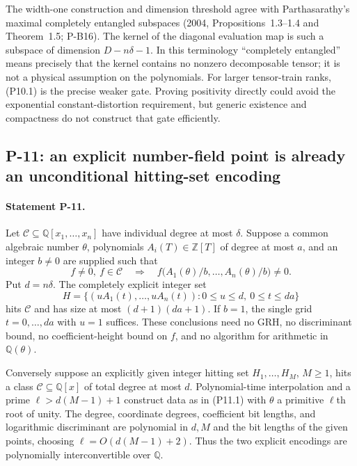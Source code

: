 \documentclass[11pt,a4paper]{article}
\theoremstyle{definition}\newtheorem{definition}{Definition}
\begin{document}
The width-one construction and dimension threshold agree with Parthasarathy's maximal completely entangled subspaces (2004, Propositions~1.3--1.4 and Theorem~1.5; P-B16). The kernel of the diagonal evaluation map is such a subspace of dimension $D-n\delta-1$. In this terminology ``completely entangled'' means precisely that the kernel contains no nonzero decomposable tensor; it is not a physical assumption on the polynomials. For larger tensor-train ranks, (P10.1) is the precise weaker gate. Proving positivity directly could avoid the exponential constant-distortion requirement, but generic existence and compactness do not construct that gate efficiently.

\subsection{P-11: an explicit number-field point is already an unconditional hitting-set encoding}
\paragraph{Statement P-11.}
Let $\mathcal C\subseteq\mathbb Q[x_1,\ldots,x_n]$ have individual degree at most $\delta$. Suppose a common algebraic number $\theta$, polynomials $A_i(T)\in\mathbb Z[T]$ of degree at most $a$, and an integer $b\ne0$ are supplied such that
\[
 f\ne0,\ f\in\mathcal C\quad\Longrightarrow\quad
 f\bigl(A_1(\theta)/b,\ldots,A_n(\theta)/b\bigr)\ne0.
 \tag{P11.1}
\]
Put $d=n\delta$. The completely explicit integer set
\[
 H=\{(uA_1(t),\ldots,uA_n(t)):
        0\le u\le d,\ 0\le t\le da\}
 \tag{P11.2}
\]
hits $\mathcal C$ and has size at most $(d+1)(da+1)$. If $b=1$, the single grid $t=0,\ldots,da$ with $u=1$ suffices. These conclusions need no GRH, no discriminant bound, no coefficient-height bound on $f$, and no algorithm for arithmetic in $\mathbb Q(\theta)$.

Conversely suppose an explicitly given integer hitting set $H_1,\ldots,H_M$, $M\ge1$, hits a class $\mathcal C\subseteq\mathbb Q[x]$ of total degree at most $d$. Polynomial-time interpolation and a prime $\ell>d(M-1)+1$ construct data as in (P11.1) with $\theta$ a primitive $\ell$th root of unity. The degree, coordinate degrees, coefficient bit lengths, and logarithmic discriminant are polynomial in $d,M$ and the bit lengths of the given points, choosing $\ell=O(d(M-1)+2)$. Thus the two explicit encodings are polynomially interconvertible over $\mathbb Q$.
\end{document}
